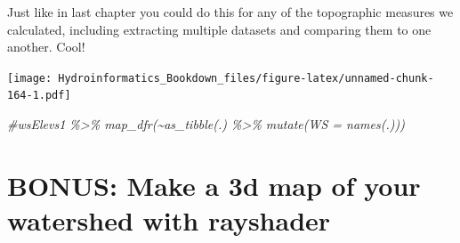 \documentclass[
]{book}
\newenvironment{Shaded}{\begin{snugshade}}{\end{snugshade}}
\newcommand{\AttributeTok}[1]{\textcolor[rgb]{0.77,0.63,0.00}{#1}}
\newcommand{\CommentTok}[1]{\textcolor[rgb]{0.56,0.35,0.01}{\textit{#1}}}
\newcommand{\FunctionTok}[1]{\textcolor[rgb]{0.00,0.00,0.00}{#1}}
\newcommand{\NormalTok}[1]{#1}
\newcommand{\OtherTok}[1]{\textcolor[rgb]{0.56,0.35,0.01}{#1}}
\newcommand{\SpecialCharTok}[1]{\textcolor[rgb]{0.00,0.00,0.00}{#1}}
\newcommand{\StringTok}[1]{\textcolor[rgb]{0.31,0.60,0.02}{#1}}
\begin{document}
Just like in last chapter you could do this for any of the topographic measures we calculated, including extracting multiple datasets and comparing them to one another. Cool!

\begin{Shaded}
\end{Shaded}

\texttt{[image: Hydroinformatics\_Bookdown\_files/figure-latex/unnamed-chunk-164-1.pdf]}

\begin{Shaded}
\begin{Highlighting}[]
\CommentTok{\#wsElevs1 \%\textgreater{}\% map\_dfr(\textasciitilde{}as\_tibble(.) \%\textgreater{}\% mutate(WS = names(.)))}
\end{Highlighting}
\end{Shaded}

\hypertarget{bonus-make-a-3d-map-of-your-watershed-with-rayshader}{%
\section{BONUS: Make a 3d map of your watershed with rayshader}\label{bonus-make-a-3d-map-of-your-watershed-with-rayshader}}
\end{document}
